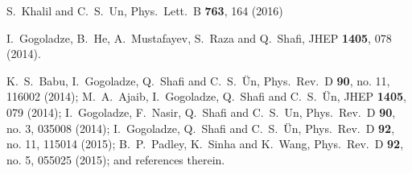 \documentclass[12pt]{article}
\begin{document}
\begin{thebibliography}{99}
  S.~Khalil and C.~S.~Un,
  Phys.\ Lett.\ B {\bf 763}, 164 (2016)

  I.~Gogoladze, B.~He, A.~Mustafayev, S.~Raza and Q.~Shafi,
  JHEP {\bf 1405}, 078 (2014). 

  K.~S.~Babu, I.~Gogoladze, Q.~Shafi and C.~S.~Ün,
  Phys.\ Rev.\ D {\bf 90}, no. 11, 116002 (2014);
  M.~A.~Ajaib, I.~Gogoladze, Q.~Shafi and C.~S.~Ün,
  JHEP {\bf 1405}, 079 (2014);
  I.~Gogoladze, F.~Nasir, Q.~Shafi and C.~S.~Un,
  Phys.\ Rev.\ D {\bf 90}, no. 3, 035008 (2014);
  I.~Gogoladze, Q.~Shafi and C.~S.~Ün,
  Phys.\ Rev.\ D {\bf 92}, no. 11, 115014 (2015);
  B.~P.~Padley, K.~Sinha and K.~Wang,
  Phys.\ Rev.\ D {\bf 92}, no. 5, 055025 (2015); and references therein.




\end{thebibliography}
\end{document}
